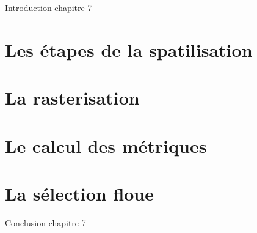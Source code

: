 \chaptertoc{}


Introduction chapitre 7

\section{Les étapes de la spatilisation}
\section{La rasterisation}
\section{Le calcul des métriques}
\section{La sélection floue}


Conclusion chapitre 7